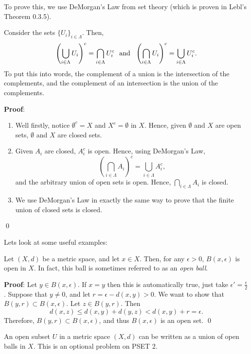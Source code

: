 To prove this, we use DeMorgan's Law from set theory (which is proven in Lebl's Theorem 0.3.5).
\begin{proposition}
Consider the sets $\{U_i\}_{i\in \Lambda}$. Then,
\[
\left(\bigcup_{i\in \Lambda}U_i \right)^c = \bigcap_{i\in \Lambda}U_i^c \hspace{.25cm} \text{and} \hspace{.25cm} \left(\bigcap_{i\in \Lambda}U_i \right)^c = \bigcup_{i\in \Lambda}U_i^c.
\]
To put this into words, the complement of a union is the intersection of the complements, and the complement of an intersection is the union of the complements.
\end{proposition}
\textbf{Proof}:
\begin{enumerate}
    \item Well firstly, notice $\emptyset^c = X$ and $X^c = \emptyset$ in $X$. Hence, given $\emptyset$ and $X$ are open sets, $\emptyset$ and $X$ are closed sets.
    \item Given $A_i$ are closed, $A_i^c$ is open. Hence, using DeMorgan's Law, 
    \[
    \left(\bigcap_{i\in \Lambda}A_i \right)^c = \bigcup_{i\in \Lambda}A_i^c,
    \]
    and the arbitrary union of open sets is open. Hence, $\bigcap_{i\in \Lambda}A_i$ is closed.
    \item We use DeMorgan's Law in exactly the same way to prove that the finite union of closed sets is closed.
\end{enumerate}
\qed 

Lets look at some useful examples:
\begin{example}
Let $(X,d)$ be a metric space, and let $x\in X$. Then, for any $\epsilon>0$, $B(x,\epsilon)$ is open in $X$. In fact, this ball is sometimes referred to as an \textit{open ball}.
\end{example}
\textbf{Proof}: Let $y\in B(x,\epsilon)$. If $x = y$ then this is automatically true, just take $\epsilon' = \frac{\epsilon}{2}$. Suppose that $y\neq 0$, and let $r = \epsilon - d(x,y)>0$. We want to show that $B(y,r) \subset B(x,\epsilon).$ Let $z\in B(y,r).$ Then \[d(x,z) \leq d(x,y) + d(y,z) < d(x,y) + r = \epsilon.\] Therefore, $B(y,r) \subset B(x,\epsilon)$, and thus $B(x,\epsilon)$ is an open set. \qed 

\begin{theorem}
An open subset $U$ in a metric space $(X,d)$ can be written as a union of open balls in $X$. This is an optional problem on PSET 2.
\end{theorem}


